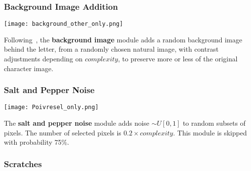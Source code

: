 \documentclass{article} %
\begin{document}

\subsubsection*{Background Image Addition}

\begin{minipage}[t]{\linewidth}
\begin{minipage}[t]{0.14\linewidth}
\centering
\vspace*{0mm}
\texttt{[image: background\_other\_only.png]}
\end{minipage}%
\hspace{0.3cm}\begin{minipage}[t]{0.83\linewidth}
\vspace*{1mm}
Following~\citet{Larochelle-jmlr-2009}, the {\bf background image} module adds a random
background image behind the letter, from a randomly chosen natural image,
with contrast adjustments depending on $complexity$, to preserve
more or less of the original character image.
\end{minipage}
\end{minipage}

\subsubsection*{Salt and Pepper Noise}

\begin{minipage}[t]{0.14\linewidth}
\centering
\vspace*{0mm}
\texttt{[image: Poivresel\_only.png]}
\end{minipage}%
\hspace{0.3cm}\begin{minipage}[t]{0.83\linewidth}
\vspace*{1mm}
The {\bf salt and pepper noise} module adds noise $\sim U[0,1]$ to random subsets of pixels.
The number of selected pixels is $0.2 \times complexity$.
This module is skipped with probability 75\%.
\end{minipage}

\subsubsection*{Scratches}
\end{document}
